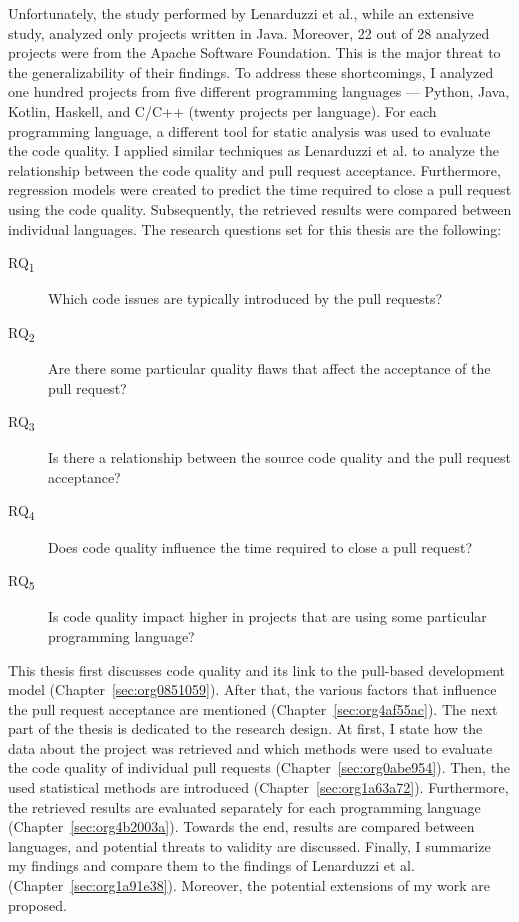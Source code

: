 \documentclass[digital,oneside,oldtable,nolof,nolot,nocover]{fithesis4}
\begin{document}
Unfortunately, the study performed by Lenarduzzi et al., while an extensive
study, analyzed only projects written in Java. Moreover, 22 out of 28 analyzed
projects were from the Apache Software Foundation. This is the major threat to
the generalizability of their findings. To address these shortcomings, I
analyzed one hundred projects from five different programming languages ---
Python, Java, Kotlin, Haskell, and C/C++ (twenty projects per language). For
each programming language, a different tool for static analysis was used to
evaluate the code quality. I applied similar techniques as Lenarduzzi et
al. to analyze the relationship between the code quality and pull request
acceptance. Furthermore, regression models were created to predict the
time required to close a pull request using the code quality. Subsequently,
the retrieved results were compared between individual languages.
\newpage{}
\noindent{}The research questions set for this thesis are the following:
\begin{description}
\item[{RQ\textsubscript{1}}] Which code issues are typically introduced by the pull requests?
\item[{RQ\textsubscript{2}}] Are there some particular quality flaws that affect the acceptance of the pull request?
\item[{RQ\textsubscript{3}}] Is there a relationship between the source code quality and the pull request acceptance?
\item[{RQ\textsubscript{4}}] Does code quality influence the time required to close a pull request?
\item[{RQ\textsubscript{5}}] Is code quality impact higher in projects that are using some particular programming language?
\end{description}

This thesis first discusses code quality and its link to the pull-based
development model (Chapter~\ref{sec:org0851059}).
After that, the various factors that influence the pull request acceptance are
mentioned (Chapter~\ref{sec:org4af55ac}). The next part of the thesis
is dedicated to the research design. At first, I state how the data about the
project was retrieved and which methods were used to evaluate the code quality
of individual pull requests (Chapter~\ref{sec:org0abe954}). Then, the used
statistical methods are introduced (Chapter~\ref{sec:org1a63a72}). Furthermore,
the retrieved results are evaluated separately for each programming language
(Chapter~\ref{sec:org4b2003a}). Towards the end, results are compared between
languages, and potential threats to validity are discussed. Finally, I
summarize my findings and compare them to the findings of Lenarduzzi et al.
(Chapter~\ref{sec:org1a91e38}). Moreover, the potential extensions of my work are
proposed.
\end{document}
